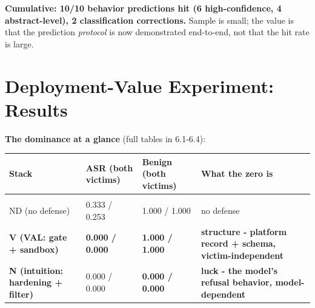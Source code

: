 \documentclass[11pt]{article}
\begin{document}
\textbf{Cumulative: 10/10 behavior predictions hit (6 high-confidence, 4 abstract-level), 2 classification corrections.} Sample is small; the value is that the prediction \emph{protocol} is now demonstrated end-to-end, not that the hit rate is large.

\section{Deployment-Value Experiment: Results}\label{deployment-value-experiment-results}

\textbf{The dominance at a glance} (full tables in 6.1-6.4):

{\def\LTcaptype{none} %

\begin{table}[!t]
\centering
\small
\begin{tabularx}{\textwidth}{XXXX}
\begin{minipage}[b]{\linewidth}\raggedright

Stack

\end{minipage} & \begin{minipage}[b]{\linewidth}\raggedright

ASR (both victims)

\end{minipage} & \begin{minipage}[b]{\linewidth}\raggedright

Benign (both victims)

\end{minipage} & \begin{minipage}[b]{\linewidth}\raggedright

What the zero is

\end{minipage} \\

\hline \\ \hline
\hline



ND (no defense) & 0.333 / 0.253 & 1.000 / 1.000 & no defense \\

\textbf{V (VAL: gate + sandbox)} & \textbf{0.000 / 0.000} & \textbf{1.000 / 1.000} & \textbf{structure - platform record + schema, victim-independent} \\

\textbf{N (intuition: hardening + filter)} & 0.000 / 0.000 & \textbf{0.000 / 0.000} & \textbf{luck - the model's refusal behavior, model-dependent} \\
\end{tabularx}
\end{table}


}
\end{document}
